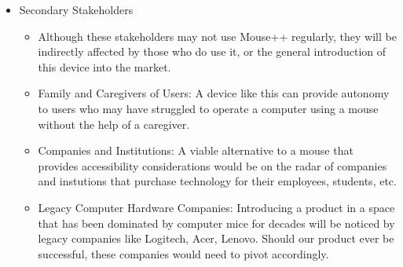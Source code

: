 \documentclass{article}
\begin{document}
\begin{itemize}
\begin{itemize}
\begin{itemize}
        \end{itemize}
      \end{itemize}
  \item Secondary Stakeholders
    \begin{itemize}
      \item Although these stakeholders may not use Mouse++ regularly, they will be indirectly affected by those who do use it, or the general introduction of this device into the market.
      \item Family and Caregivers of Users: A device like this can provide autonomy to users who may have struggled to operate a computer using a mouse without the help of a caregiver. 
      \item Companies and Institutions: A viable alternative to a mouse that provides accessibility considerations would be on the radar of companies and instutions that purchase technology for their employees, students, etc. \\
      \item Legacy Computer Hardware Companies: Introducing a product in a space that has been dominated by computer mice for decades will be noticed by legacy companies like Logitech, Acer, Lenovo. Should our product ever be successful, these companies would need to pivot accordingly.
    \end{itemize}
  
\end{itemize}
\end{document}
